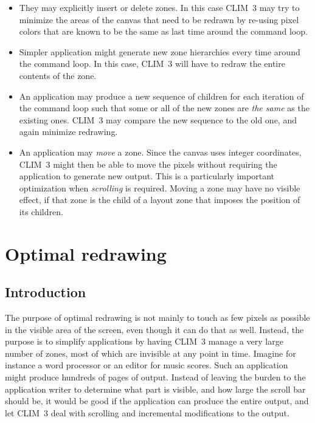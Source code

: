 \documentclass{report}
\def\clim{CLIM~3}
\begin{document}
\begin{itemize}
\item They may explicitly insert or delete zones.  In this case
  \clim{} may try to minimize the areas of the canvas that need to be
  redrawn by re-using pixel colors that are known to be the same as
  last time around the command loop.

\item Simpler application might generate new zone hierarchies every
  time around the command loop.  In this case, \clim{} will have to
  redraw the entire contents of the zone.

\item An application may produce a new sequence of children for each
  iteration of the command loop such that some or all of the new zones
  are \emph{the same} as the existing ones.  \clim{} may compare the
  new sequence to the old one, and again minimize redrawing.

\item An application may \emph{move} a zone.  Since the canvas uses
  integer coordinates, \clim{} might then be able to move the pixels
  without requiring the application to generate new output.  This is a
  particularly important optimization when \emph{scrolling} is
  required.  Moving a zone may have no visible effect, if that zone is
  the child of a layout zone that imposes the position of its
  children.
\end{itemize}

\chapter{Optimal redrawing}

\section{Introduction}

The purpose of optimal redrawing is not mainly to touch as few pixels
as possible in the visible area of the screen, even though it can do
that as well.  Instead, the purpose is to simplify applications by
having \clim{} manage a very large number of zones, most of which
are invisible at any point in time.  Imagine for instance a word
processor or an editor for music scores.  Such an application might
produce hundreds of pages of output.  Instead of leaving the burden to
the application writer to determine what part is visible, and how
large the scroll bar should be, it would be good if the application
can produce the entire output, and let \clim{} deal with scrolling and
incremental modifications to the output.  
\end{document}
